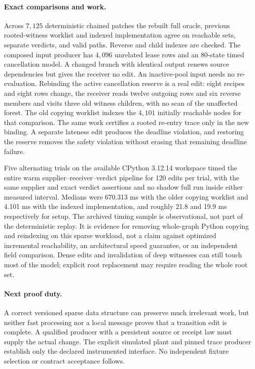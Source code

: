 \documentclass{article}
\begin{document}
\paragraph{Exact comparisons and work.}
Across $7{,}125$ deterministic chained patches the rebuilt full oracle,
previous rooted-witness worklist and indexed implementation agree on
reachable sets, separate verdicts, and valid paths. Reverse and child
indexes are checked. The composed input producer has $4{,}096$ unrelated
lease rows and an 80-state timed cancellation model. A changed branch
with identical output renews source dependencies but gives the receiver
no edit. An inactive-pool input needs no re-evaluation. Rebinding the
active cancellation reserve is a real edit: eight recipes and eight
rows change, the receiver reads twelve outgoing rows and six reverse
members and visits three old witness children, with no scan of the
unaffected forest. The old copying worklist indexes the $4{,}101$
initially reachable nodes for that comparison. The same work certifies
a rooted re-entry trace only in the new binding. A separate lateness
edit produces the deadline violation, and restoring the reserve removes
the safety violation without erasing that remaining deadline failure.

Five alternating trials on the available CPython 3.12.14 workspace
timed the entire warm supplier--receiver--verdict pipeline for 120 edits
per trial, with the same supplier and exact verdict assertions and no
shadow full run inside either measured interval. Medians were 670.313
ms with the older copying worklist and 4.101 ms with the indexed
implementation, and roughly 21.8 and 19.9 ms respectively for setup.
The archived timing sample is observational, not part of the deterministic
replay. It is evidence for removing whole-graph Python copying and
reindexing on this sparse workload, not a claim against optimized
incremental reachability, an architectural speed guarantee, or an
independent field comparison. Dense edits and invalidation of deep
witnesses can still touch most of the model; explicit root replacement
may require reading the whole root set.

\paragraph{Next proof duty.}
A correct versioned sparse data structure can preserve much irrelevant
work, but neither fast processing nor a local message proves that a
transition edit is complete. A qualified producer with a persistent
source or receipt law must supply the actual change. The explicit
simulated plant and pinned trace producer establish only the declared
instrumented interface. No independent fixture selection or contract
acceptance follows.
\end{document}

